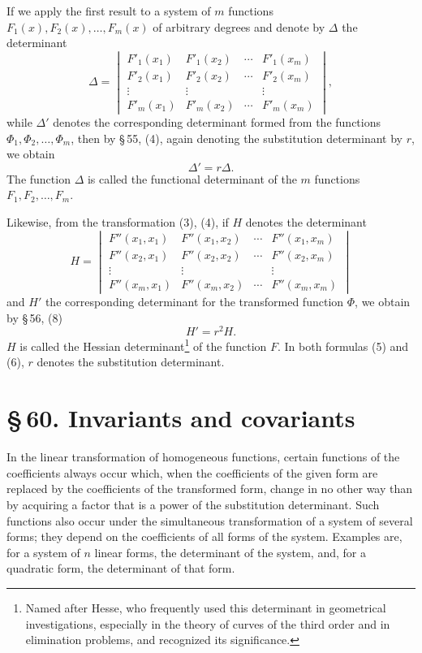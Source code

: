 \documentclass[11pt]{article}
\providecommand{\sect}[2]{\section*{\S\,#1. #2}}
\begin{document}
If we apply the first result to a system of $m$ functions $F_1(x),F_2(x),\ldots,F_m(x)$ of arbitrary degrees and denote by $\Delta$ the determinant
\[
\Delta=\begin{vmatrix}
 F'_1(x_1)&F'_1(x_2)&\cdots&F'_1(x_m)\\
 F'_2(x_1)&F'_2(x_2)&\cdots&F'_2(x_m)\\
 \vdots&\vdots&&\vdots\\
 F'_m(x_1)&F'_m(x_2)&\cdots&F'_m(x_m)
\end{vmatrix},
\]
while $\Delta'$ denotes the corresponding determinant formed from the functions $\Phi_1,\Phi_2,\ldots,\Phi_m$, then by \S\,55, (4), again denoting the substitution determinant by $r$, we obtain
\begin{equation}
 \Delta'=r\Delta.
\tag{5}
\end{equation}
The function $\Delta$ is called the functional determinant of the $m$ functions $F_1,F_2,\ldots,F_m$.

Likewise, from the transformation (3), (4), if $H$ denotes the determinant
\[
H=\begin{vmatrix}
 F''(x_1,x_1)&F''(x_1,x_2)&\cdots&F''(x_1,x_m)\\
 F''(x_2,x_1)&F''(x_2,x_2)&\cdots&F''(x_2,x_m)\\
 \vdots&\vdots&&\vdots\\
 F''(x_m,x_1)&F''(x_m,x_2)&\cdots&F''(x_m,x_m)
\end{vmatrix}
\]
and $H'$ the corresponding determinant for the transformed function $\Phi$, we obtain by \S\,56, (8)
\begin{equation}
 H'=r^2H.
\tag{6}
\end{equation}
$H$ is called the Hessian determinant\footnote{Named after Hesse, who frequently used this determinant in geometrical investigations, especially in the theory of curves of the third order and in elimination problems, and recognized its significance.} of the function $F$. In both formulas (5) and (6), $r$ denotes the substitution determinant.

\sect{60}{Invariants and covariants}

In the linear transformation of homogeneous functions, certain functions of the coefficients always occur which, when the coefficients of the given form are replaced by the coefficients of the transformed form, change in no other way than by acquiring a factor that is a power of the substitution determinant. Such functions also occur under the simultaneous transformation of a system of several forms; they depend on the coefficients of all forms of the system. Examples are, for a system of $n$ linear forms, the determinant of the system, and, for a quadratic form, the determinant of that form.
\end{document}
